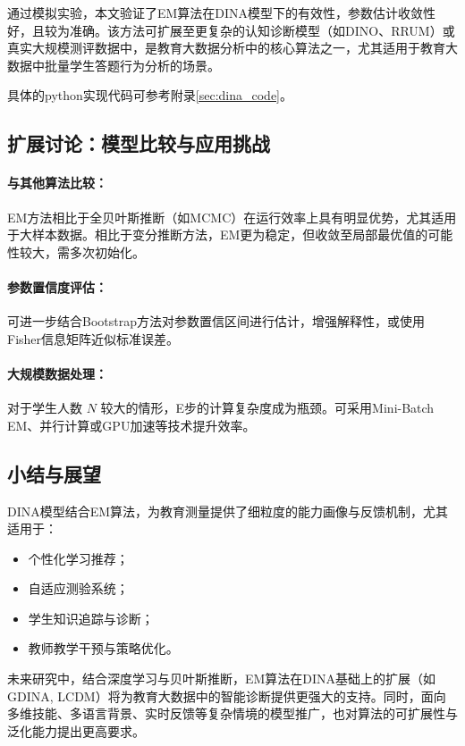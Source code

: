 \documentclass[a4paper,12pt]{ctexart} %
\begin{document}
通过模拟实验，本文验证了EM算法在DINA模型下的有效性，参数估计收敛性好，且较为准确。该方法可扩展至更复杂的认知诊断模型（如DINO、RRUM）或真实大规模测评数据中，是教育大数据分析中的核心算法之一，尤其适用于教育大数据中批量学生答题行为分析的场景。

具体的python实现代码可参考附录\ref{sec:dina_code}。
\subsection{扩展讨论：模型比较与应用挑战}

\paragraph{与其他算法比较：} EM方法相比于全贝叶斯推断（如MCMC）在运行效率上具有明显优势，尤其适用于大样本数据。相比于变分推断方法，EM更为稳定，但收敛至局部最优值的可能性较大，需多次初始化。

\paragraph{参数置信度评估：} 可进一步结合Bootstrap方法对参数置信区间进行估计，增强解释性，或使用Fisher信息矩阵近似标准误差。

\paragraph{大规模数据处理：} 对于学生人数 $N$ 较大的情形，E步的计算复杂度成为瓶颈。可采用Mini-Batch EM、并行计算或GPU加速等技术提升效率。

\subsection{小结与展望}

DINA模型结合EM算法，为教育测量提供了细粒度的能力画像与反馈机制，尤其适用于：

\begin{itemize}
  \item 个性化学习推荐；
  \item 自适应测验系统；
  \item 学生知识追踪与诊断；
  \item 教师教学干预与策略优化。
\end{itemize}

未来研究中，结合深度学习与贝叶斯推断，EM算法在DINA基础上的扩展（如GDINA, LCDM）将为教育大数据中的智能诊断提供更强大的支持。同时，面向多维技能、多语言背景、实时反馈等复杂情境的模型推广，也对算法的可扩展性与泛化能力提出更高要求。
\end{document}
